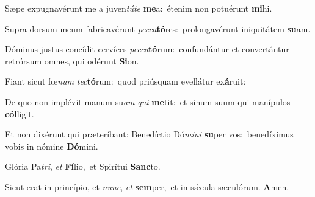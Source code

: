\vs Sæpe expugnavérunt me a juven\textit{tú}\textit{te} \textbf{me}a:~\redgreheightstar étenim non potuérunt \textbf{mi}hi.

\vs Supra dorsum meum fabricavérunt \textit{pec}\textit{ca}\textbf{tó}res:~\redgreheightstar prolongavérunt iniquitátem \textbf{su}am.

\vs Dóminus justus concídit cervíces \textit{pec}\textit{ca}\textbf{tó}rum:~\redgreheightstar confundántur et convertántur retrórsum omnes, qui odérunt \textbf{Si}on.

\vs Fiant sicut fœ\textit{num} \textit{tec}\textbf{tó}rum:~\redgreheightstar quod priúsquam evellátur ex\textbf{á}ruit:

\vs De quo non implévit manum su\textit{am} \textit{qui} \textbf{me}tit:~\redgreheightstar et sinum suum qui manípulos \textbf{cól}ligit.

\vs Et non dixérunt qui præteríbant: Benedíctio Dó\textit{mi}\textit{ni} \textbf{su}per vos:~\redgreheightstar benedíximus vobis in nómine \textbf{Dó}mini.

\vs Glória Pa\textit{tri}, \textit{et} \textbf{Fí}lio,~\redgreheightstar et Spirítui \textbf{Sanc}to.

\vs Sicut erat in princípio, et \textit{nunc}, \textit{et} \textbf{sem}per,~\redgreheightstar et in sǽcula sæculórum. \textbf{A}men.
